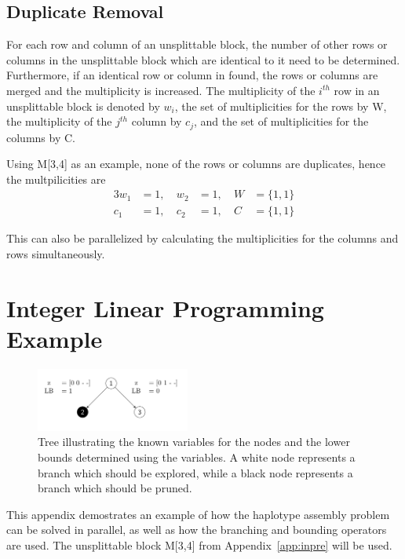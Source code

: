 \documentclass[10pt,twocolumn]{article}
\begin{document}
\subsection{Duplicate Removal} \label{app:duprem}

For each row and column of an unsplittable block, the number of other rows or columns in the unsplittable
block which are identical to it need to be determined. Furthermore, if an identical row or column in found,
the rows or columns are merged and the multiplicity is increased. The multiplicity of the $i^{th}$ row in an
unsplittable block is denoted by $w_i$, the set of multiplicities for the rows by W, the multiplicity of the
$j^{th}$ column by $c_j$, and the set of multiplicities for the columns by C.

Using M[3,4] as an example, none of the rows or columns are duplicates, hence the multpilicities are
\begin{alignat*}{3}
    w_1 &= 1, & \ w_2 &= 1, & \ W &= \{1, 1\} \\
    c_1 &= 1, & \ c_2 &= 1, & \ C &= \{1, 1\}
\end{alignat*}

This can also be parallelized by calculating the multiplicities for the columns and rows simultaneously.

\section{Integer Linear Programming Example} \label{app:ilpex}

\begin{figure}[b!]
\centering
\includegraphics[width=0.45\textwidth]{tree1}
\caption{Tree illustrating the known variables for the nodes and the lower bounds determined using the
variables. A white node represents a branch which should be explored, while a black node represents a
branch which should be pruned.}
\label{fig:tree1}
\end{figure}

This appendix demostrates an example of how the haplotype assembly problem can be solved in parallel, as well
as how the branching and bounding operators are used. The unsplittable block M[3,4] from 
Appendix~\ref{app:inpre} will be used.
\end{document}
